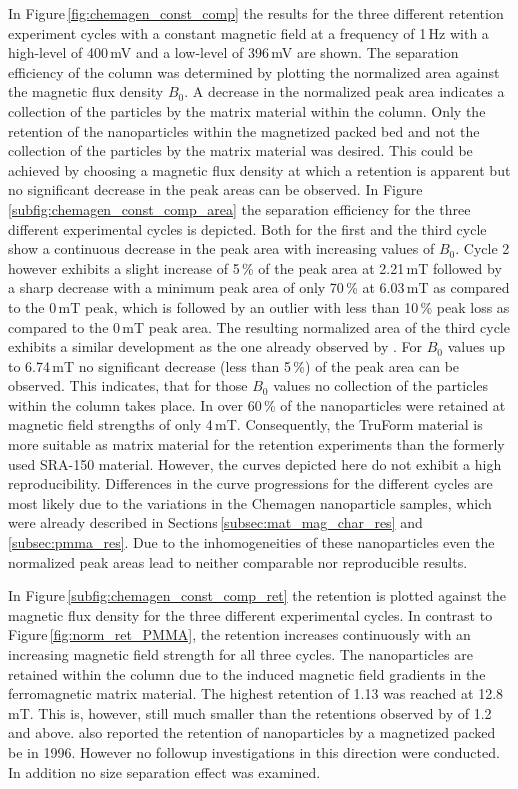 In Figure\,\ref{fig:chemagen_const_comp} the results for the three different retention experiment cycles with a constant magnetic field at a frequency of 1\,Hz with a high-level of 400\,mV and a low-level of 396\,mV are shown. The separation efficiency of the column was determined by plotting the normalized area against the magnetic flux density $B_{0}$. A decrease in the normalized peak area indicates a collection of the particles by the matrix material within the column. Only the retention of the nanoparticles within the magnetized packed bed and not the collection of the particles by the matrix material was desired. This could be achieved by choosing a magnetic flux density at which a retention is apparent but no significant decrease in the peak areas can be observed. In Figure\,\ref{subfig:chemagen_const_comp_area} the separation efficiency for the three different experimental cycles is depicted. Both for the first and the third cycle show a continuous decrease in the peak area with increasing values of $B_{0}$. Cycle 2 however exhibits a slight increase of 5\,\% of the peak area at 2.21\,mT followed by a sharp decrease with a minimum peak area of only 70\,\% at 6.03\,mT as compared to the 0\,mT peak, which is followed by an outlier with less than 10\,\% peak loss as compared to the 0\,mT peak area. The resulting normalized area of the third cycle exhibits a similar development as the one already observed by \cite{AndreMaster}. For $B_{0}$ values up to 6.74\,mT no significant decrease (less than 5\,\%) of the peak area can be observed. This indicates, that for those $B_{0}$ values no collection of the particles within the column takes place. In \cite{AndreMaster} over 60\,\% of the nanoparticles were retained at magnetic field strengths of only 4\,mT. Consequently, the TruForm material is more suitable as matrix material for the retention experiments than the formerly used SRA-150 material. However, the curves depicted here do not exhibit a high reproducibility.  Differences in the curve progressions for the different cycles are most likely due to the variations in the Chemagen nanoparticle samples, which were already described in Sections\,\ref{subsec:mat_mag_char_res} and \ref{subsec:pmma_res}. Due to the inhomogeneities of these nanoparticles even the normalized peak areas lead to neither comparable nor reproducible results.

In Figure\,\ref{subfig:chemagen_const_comp_ret} the retention is plotted against the magnetic flux density for the three different experimental cycles. In contrast to Figure\,\ref{fig:norm_ret_PMMA}, the retention increases continuously with an increasing magnetic field strength for all three cycles. The nanoparticles are retained within the column due to the induced magnetic field gradients in the ferromagnetic matrix material. The highest retention of 1.13 was reached at 12.8\,mT. This is, however, still much smaller than the retentions observed by \cite{AndreMaster} of 1.2 and above. \cite{nomizu1996magnetic} also reported the retention of nanoparticles by a magnetized packed be in 1996. However no followup investigations in this direction were conducted. In addition no size separation effect was examined. 

